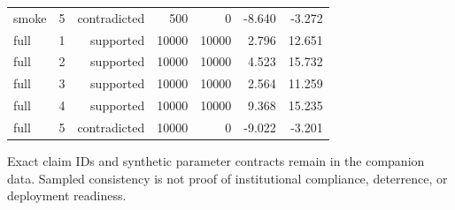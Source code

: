 {\begin{table}[t]
\begin{tabular}{lrrrrrr}
smoke & 5 & contradicted & 500 & 0 & -8.640 & -3.272 \\
full & 1 & supported & 10000 & 10000 & 2.796 & 12.651 \\
full & 2 & supported & 10000 & 10000 & 4.523 & 15.732 \\
full & 3 & supported & 10000 & 10000 & 2.564 & 11.259 \\
full & 4 & supported & 10000 & 10000 & 9.368 & 15.235 \\
full & 5 & contradicted & 10000 & 0 & -9.022 & -3.201 \\
\bottomrule
\end{tabular}
\par\smallskip
\begin{minipage}{\textwidth}\small Exact claim IDs and synthetic parameter contracts remain in the companion data. Sampled consistency is not proof of institutional compliance, deterrence, or deployment readiness.\end{minipage}
\end{table}
}
